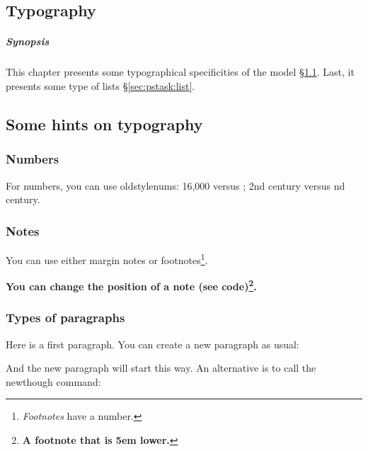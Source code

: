 \begin{fullwidth}
\chapter[TYPOGRAPHY]{Typography}
\label{chap:task}
\end{fullwidth}


\paragraph{Synopsis}
This chapter presents some typographical specificities of the model §\ref{sec:task:typo}. Last, it presents some type of lists §\ref{sec:pstask:list}.


\section{Some hints on typography}
\label{sec:task:typo}

\subsection{Numbers}

For numbers, you can use oldstylenums: 16,000 versus ; 2nd century versus nd century.

\subsection{Notes}


You can use either margin notes or footnotes\footnote{\textit{Footnotes} have a number.}. %

\textbf{You can change the position of a note (see code)\footnote[][5em]{\textbf{A footnote that is 5em lower.}}.}

\subsection{Types of paragraphs}

Here is a first paragraph. You can create a new paragraph as usual:

And the new paragraph will start this way. An alternative is to call the newthough command:

